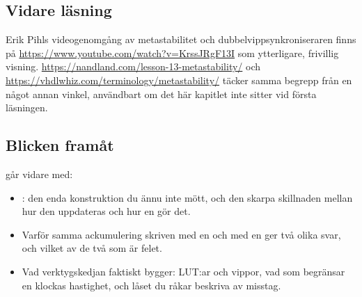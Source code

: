 \subsection*{Vidare läsning}
Erik Pihls videogenomgång av metastabilitet och dubbelvippsynkroniseraren finns på
\url{https://www.youtube.com/watch?v=KrssJRgF13I} som ytterligare, frivillig visning.
\url{https://nandland.com/lesson-13-metastability/} och
\url{https://vhdlwhiz.com/terminology/metastability/} täcker samma begrepp från en något annan
vinkel, användbart om det här kapitlet inte sitter vid första läsningen.

\subsection*{Blicken framåt}
 går vidare med:
\begin{itemize}
  \item {}: den enda konstruktion du ännu inte mött, och den skarpa skillnaden mellan
    hur den uppdateras och hur en  gör det.
  \item Varför samma ackumulering skriven med en  och med en  ger två
    olika svar, och vilket av de två som är felet.
  \item Vad verktygskedjan faktiskt bygger: LUT:ar och vippor, vad som begränsar en klockas
    hastighet, och låset du råkar beskriva av misstag.
\end{itemize}
